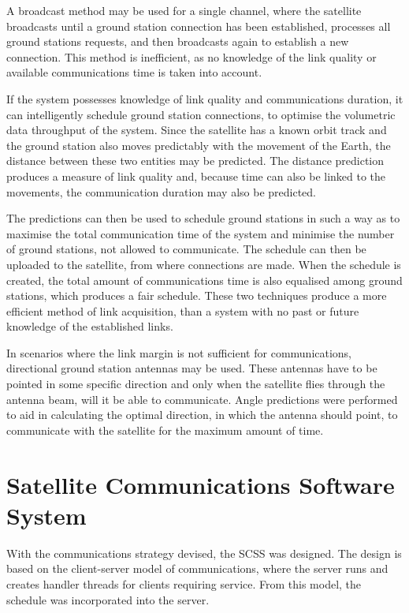 A broadcast method may be used for a single channel, where the satellite broadcasts until a
ground station connection has been established, processes all ground stations requests, and
then broadcasts again to establish a new connection. This method is inefficient, as no knowledge
of the link quality or available communications time is taken into account. 

If the system possesses knowledge of link quality and communications duration, it can intelligently
schedule ground station connections, to optimise the volumetric data throughput of the system.
Since the satellite has a known orbit track and the ground station also moves predictably with
the movement of the Earth, the distance between these two entities may be predicted. The
distance prediction produces a measure of link quality and, because time can also be linked
to the movements, the communication duration may also be predicted.

The predictions can then be used to schedule ground stations in such a way as to maximise
the total communication time of the system and minimise the number of ground stations, not
allowed to communicate. The schedule can then be uploaded to the satellite, from where
connections are made. When the schedule is created, the total amount of communications time
is also equalised among ground stations, which produces a fair schedule. These two techniques
produce a more efficient method of link acquisition, than a system with no past or future knowledge
of the established links.

In scenarios where the link margin is not sufficient for communications, directional ground station
antennas may be used. These antennas have to be pointed in some specific direction and only
when the satellite flies through the antenna beam, will it be able to communicate. Angle predictions
were performed to aid in calculating the optimal direction, in which the antenna should point, to
communicate with the satellite for the maximum amount of time.

\section{Satellite Communications Software System}
\label{software_system}

With the communications strategy devised, the SCSS was designed. The design is
based on the client-server model of communications, where the server runs and creates handler
threads for clients requiring service. From this model, the schedule was incorporated into
the server.

